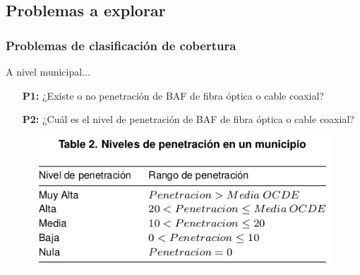 \documentclass[xcolor=dvipsnames, compress]{beamer}
\begin{document}
\begin{frame}
\section{Problemas a explorar}
\frametitle{Problemas de clasificación de cobertura}

A  nivel municipal...

\begin{itemize}
	\item[\textbf{P1:}] ¿Existe o no penetración de BAF de fibra óptica o cable coaxial?
	\item[\textbf{P2:}] ¿Cuál es el nivel de penetración de BAF de fibra óptica o cable coaxial?
\end{itemize}

\begin{figure}
	\includegraphics[scale=0.5]{images/ocde_class.jpg}
\end{figure}

\end{frame}
\end{document}
